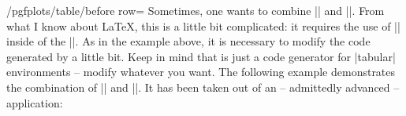 \begin{key}{/pgfplots/table/before row=}
    Sometimes, one wants to combine |\multicolumn| and |\rowcolor|. From what I
    know about \LaTeX{}, this is a little bit complicated: it requires the use of
    |\columncolor| inside of the |\multicolumn|. As in the example above, it is
    necessary to modify the code generated by \PGFPlotstable{} a little bit.
    Keep in mind that \PGFPlotstable{} is just a code generator for |tabular|
    environments -- modify whatever you want. The following example
    demonstrates the combination of |\multicolumn| and |\rowcolor|. It has been
    taken out of an -- admittedly advanced -- application:
\begin{codeexample}[pre={\begin{lateximage}},post={\end{lateximage}}]
\end{codeexample}


\end{key}
